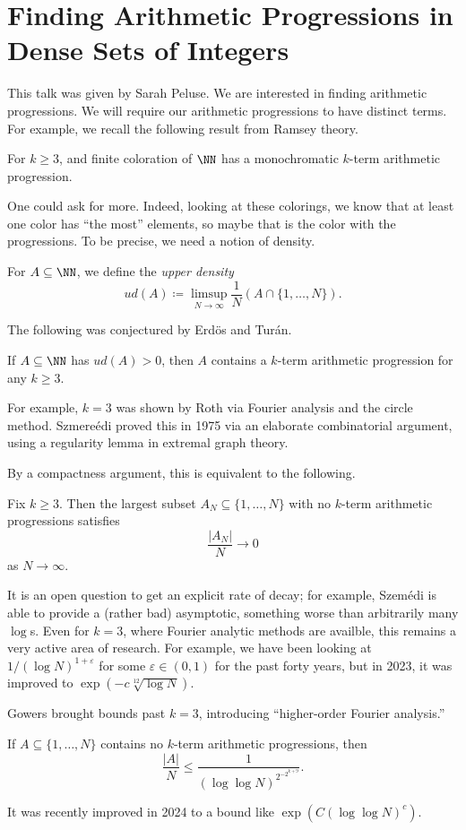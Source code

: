 \documentclass{article}
\begin{document}
\section{Finding Arithmetic Progressions in Dense Sets of Integers}
This talk was given by Sarah Peluse. We are interested in finding arithmetic progressions. We will require our arithmetic progressions to have distinct terms. For example, we recall the following result from Ramsey theory.
\begin{theorem}
	For $k\ge3$, and finite coloration of $\NN$ has a monochromatic $k$-term arithmetic progression.
\end{theorem}
One could ask for more. Indeed, looking at these colorings, we know that at least one color has ``the most'' elements, so maybe that is the color with the progressions. To be precise, we need a notion of density.
\begin{definition}
	For $A\subseteq\NN$, we define the \textit{upper density}
	\[ud(A)\coloneqq\limsup_{N\to\infty}\frac1N(A\cap\{1,\ldots,N\}).\]
\end{definition}
The following was conjectured by Erd\"os and Tur\'an.
\begin{theorem}
	If $A\subseteq\NN$ has $ud(A)>0$, then $A$ contains a $k$-term arithmetic progression for any $k\ge3$.
\end{theorem}
For example, $k=3$ was shown by Roth via Fourier analysis and the circle method. Szmere\'edi proved this in 1975 via an elaborate combinatorial argument, using a regularity lemma in extremal graph theory.

By a compactness argument, this is equivalent to the following.
\begin{theorem}
	Fix $k\ge3$. Then the largest subset $A_N\subseteq\{1,\ldots,N\}$ with no $k$-term arithmetic progressions satisfies
	\[\frac{\left|A_N\right|}N\to0\]
	as $N\to\infty$.
\end{theorem}
It is an open question to get an explicit rate of decay; for example, Szem\'edi is able to provide a (rather bad) asymptotic, something worse than arbitrarily many $\log$s. Even for $k=3$, where Fourier analytic methods are availble, this remains a very active area of research. For example, we have been looking at $1/(\log N)^{1+\varepsilon}$ for some $\varepsilon\in(0,1)$ for the past forty years, but in 2023, it was improved to $\exp(-c\sqrt[12]{\log N})$.

Gowers brought bounds past $k=3$, introducing ``higher-order Fourier analysis.''
\begin{theorem}
	If $A\subseteq\{1,\ldots,N\}$ contains no $k$-term arithmetic progressions, then
	\[\frac{\left|A\right|}N\le\frac1{(\log\log N)^{2^{-2^{k+9}}}}.\]
\end{theorem}
It was recently improved in 2024 to a bound like $\exp(C(\log\log N)^c)$.
\end{document}
